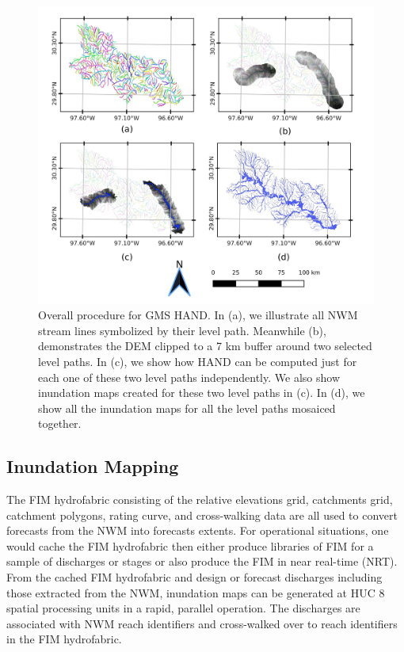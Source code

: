 \documentclass[draft]{dependencies/agujournal2019}
\begin{document}
\begin{figure}[h!]
\centering
\includegraphics[scale=1.0]{figures/gms_methods.jpg}
\caption{Overall procedure for GMS HAND.
In (a), we illustrate all NWM stream lines symbolized by their level path.
Meanwhile (b), demonstrates the DEM clipped to a 7 km buffer around two selected level paths.
In (c), we show how HAND can be computed just for each one of these two level paths independently. 
We also show inundation maps created for these two level paths in (c). 
In (d), we show all the inundation maps for all the level paths mosaiced together. }
\label{fig:gms_methods}
\end{figure}
%
\subsection{Inundation Mapping}
\label{ssec:inundation_mapping}
%
The FIM hydrofabric consisting of the relative elevations grid, catchments grid, catchment polygons, rating curve, and cross-walking data are all used to convert forecasts from the NWM into forecasts extents.
For operational situations, one would cache the FIM hydrofabric then either produce libraries of FIM for a sample of discharges or stages or also produce the FIM in near real-time (NRT).
From the cached FIM hydrofabric and design or forecast discharges including those extracted from the NWM, inundation maps can be generated at HUC 8 spatial processing units in a rapid, parallel operation. 
The discharges are associated with NWM reach identifiers and cross-walked over to reach identifiers in the FIM hydrofabric.
\end{document}
